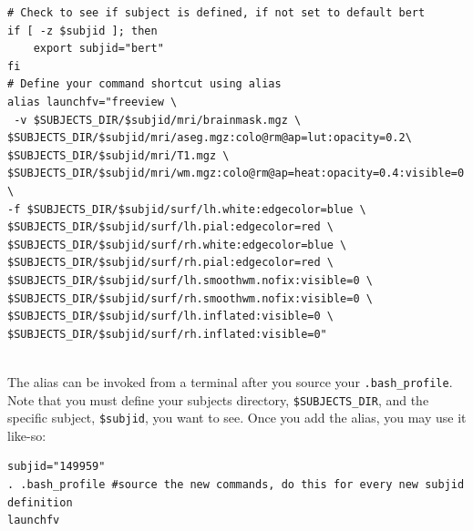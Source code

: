 \documentclass[paper=a4, fontsize=11pt]{scrartcl} %
\numberwithin{equation}{section} %
\numberwithin{figure}{section} %
\numberwithin{table}{section} %
\begin{document}
\begin{lstlisting}
# Check to see if subject is defined, if not set to default bert
if [ -z $subjid ]; then
	export subjid="bert"
fi
# Define your command shortcut using alias
alias launchfv="freeview \
 -v $SUBJECTS_DIR/$subjid/mri/brainmask.mgz \                                                                               
$SUBJECTS_DIR/$subjid/mri/aseg.mgz:colo@rm@ap=lut:opacity=0.2\                                                                                        
$SUBJECTS_DIR/$subjid/mri/T1.mgz \                                                                                                                  
$SUBJECTS_DIR/$subjid/mri/wm.mgz:colo@rm@ap=heat:opacity=0.4:visible=0 \                                                                              
-f $SUBJECTS_DIR/$subjid/surf/lh.white:edgecolor=blue \                                                                                             
$SUBJECTS_DIR/$subjid/surf/lh.pial:edgecolor=red \                                                                                                  
$SUBJECTS_DIR/$subjid/surf/rh.white:edgecolor=blue \                                                                                                
$SUBJECTS_DIR/$subjid/surf/rh.pial:edgecolor=red \                                                                                                  
$SUBJECTS_DIR/$subjid/surf/lh.smoothwm.nofix:visible=0 \                                                                                            
$SUBJECTS_DIR/$subjid/surf/rh.smoothwm.nofix:visible=0 \                                                                                            
$SUBJECTS_DIR/$subjid/surf/lh.inflated:visible=0 \                                                                                                  
$SUBJECTS_DIR/$subjid/surf/rh.inflated:visible=0"
\end{lstlisting}

~\\The alias can be invoked from a terminal after you source your \texttt{.bash\_profile}.  Note that you must define your subjects directory, \texttt{\$SUBJECTS\_DIR}, and the specific subject, \texttt{\$subjid}, you want to see. Once you add the alias, you may use it like-so:

\begin{lstlisting}
subjid="149959"
. .bash_profile #source the new commands, do this for every new subjid definition
launchfv
\end{lstlisting}
\end{document}
